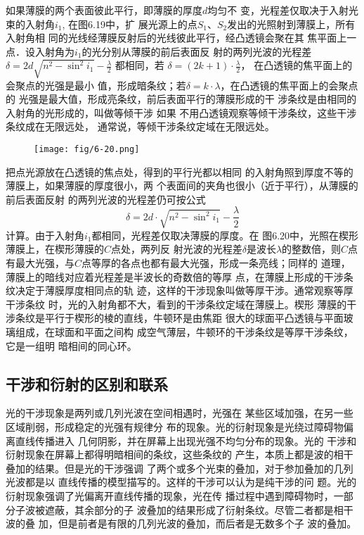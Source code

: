 如果薄膜的两个表面彼此平行，即薄膜的厚度$d$均匀不
变，光程差仅取决于入射光束的入射角$i_1$, 在图6.19中，扩
展光源上的点$S_1$、$S_2$发出的光照射到薄膜上，所有入射角相
同的光线经薄膜反射后的光线彼此平行，经凸透镜会聚在其
焦平面上一点．设入射角为$i_1$的光分别从薄膜的前后表面反
射的两列光波的光程差$\delta=2d\sqrt{n^2-\sin^2 i_1}-\frac{\lambda}{2}$
都相同，若
$\delta=(2k+1)\cdot \frac{\lambda}{2}$，
在凸透镜的焦平面上的会聚点的光强是最小
值，形成暗条纹；若$\delta=k\cdot\lambda$，在凸透镜的焦平面上的会聚点的
光强是最大值，形成亮条纹，前后表面平行的薄膜形成的干
涉条纹是由相同的入射角的光形成的，叫做等倾干涉 如果
不用凸透镜观察等倾干涉条纹，这些干涉条纹成在无限远处，
通常说，等倾干涉条纹定域在无限远处。

\begin{figure}[htp]
    \centering
     \texttt{[image: fig/6-20.png]}
    \caption{}
\end{figure}

把点光源放在凸透镜的焦点处，得到的平行光都以相同
的入射角照到厚度不等的薄膜上，如果薄膜的厚度很小，两
个表面间的夹角也很小（近于平行），从薄膜的前后表面反射
的两列光波的光程差仍可按公式
\[\delta=2d\cdot \sqrt{n^2-\sin^2 i_1}-\frac{\lambda}{2}\]
计算。由于入射角$i_1$都相同，光程差仅取决薄膜的厚度。在
图6.20中，光照在楔形薄膜上，在楔形薄膜的$C$点处，两列反
射光波的光程差$\delta$是波长$\lambda$的整数倍，则$C$点有最大光强，与$C$点等厚的各点也都有最大光强，形成一条亮线；同样的
道理，薄膜上的暗线对应着光程差是半波长的奇数倍的等厚
点，在薄膜上形成的干涉条纹决定于薄膜厚度相同点的轨
迹，这样的干涉现象叫做等厚干涉。通常观察等厚干涉条纹
时，光的入射角都不大，看到的干涉条纹定域在薄膜上。楔形
薄膜的干涉条纹是平行于楔形的棱的直线，牛顿环是由焦距
很大的球面平凸透镜与平面玻璃组成，在球面和平面之间构
成空气薄层，牛顿环的干涉条纹是等厚干涉条纹，它是一组明
暗相间的同心环。

\subsection{干涉和衍射的区别和联系}
光的干涉现象是两列或几列光波在空间相遇时，光强在
某些区域加强，在另一些区域削弱，形成稳定的光强有规律分
布的现象。光的衍射现象是光绕过障碍物偏离直线传播进入
几何阴影，并在屏幕上出现光强不均匀分布的现象。光的
干涉和衍射现象在屏幕上都得明暗相间的条纹，这些条纹的
产生，本质上都是波的相干叠加的结果。但是光的干涉强调
了两个或多个光束的叠加，对于参加叠加的几列光波都是以
直线传播的模型描写的。这样的干涉可以认为是纯干涉的问
题。光的衍射现象强调了光偏离开直线传播的现象，光在传
播过程中遇到障碍物时，一部分子波被遮蔽，其余部分的子
波叠加的结果形成了衍射条纹。尽管二者都是相干波的叠
加，但是前者是有限的几列光波的叠加，而后者是无数多个子
波的叠加。

